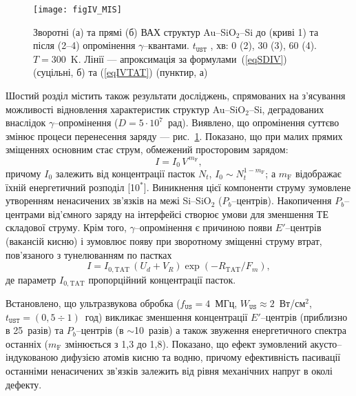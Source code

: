 \begin{figure}[b]
\center
\texttt{[image: figIV\_MIS]}%
\caption{\label{figIV_MIS}
Зворотні (а) та прямі (б) ВАХ структур Au--SiO$_2$--Si до (криві 1)
та після (2--4) опромінення $\gamma$--квантами.
$t_\mathtt{UST}$ , хв: 0 (2), 30 (3), 60 (4).
$T=300$~K.
Лінії --- апроксимація за формулами~(\ref{eqSDIV}) (суцільні, б) та (\ref{eqIVTAT}) (пунктир, а)
}%
\end{figure}

Шостий розділ містить також результати досліджень, спрямованих на з'ясування можливості відновлення характеристик структур Au--SiO$_2$--Si,
деградованих внаслідок $\gamma$--опромінення ($D=5\cdot10^7$~рад).
Виявлено, що опромінення суттєво змінює процеси перенесення заряду --- рис.~\ref{figIV_MIS}.
Показано, що при малих прямих зміщеннях основним стає струм, обмежений просторовим зарядом:
\begin{equation}\label{eqVIsclc}
  I=I_0\,V^{\,m_\mathrm{F}},
\end{equation}
причому $I_0$ залежить від концентрації пасток $N_t$, $I_0\!\sim\!N_t^{1-m_\mathrm{F}}$;
а $m_\mathrm{F}$ відображає їхній енергетичний розподіл
[10$^*$].
Виникнення цієї компоненти струму зумовлене утворенням ненасичених зв'язків на межі Si--SiO$_2$ ($P_b$--центрів).
Накопичення $P_b$--центрами від'ємного заряду на інтерфейсі створює умови для зменшення ТЕ складової струму.
Крім того, $\gamma$--опромінення є причиною появи $E'$--центрів (вакансій кисню) і зумовлює появу при зворотному зміщенні струму втрат, пов'язаного з тунелюванням по пастках
\begin{equation}\label{eqIVTAT}
  I=I_{0,\mathrm{TAT}}\,(U_d+V_R)\exp\left(-R_\mathrm{TAT}/F_m\right),
\end{equation}
де параметр $I_{0,\mathrm{TAT}}$ пропорційний концентрації пасток.

Встановлено, що
ультразвукова обробка
($f_\mathtt{US}=4$~МГц, $W_\mathtt{US}\approx2$~Вт/см$^2$, $t_\mathtt{UST}=(0,5\div1)$~год) викликає зменшення концентрації
$E'$--центрів
(приблизно в 25~разів)
та  $P_b$--центрів
(в $\sim$10~разів)
а також звуження енергетичного спектра останніх ($m_\mathrm{F}$ змінюється з 1,3 до 1,8).
Показано, що ефект зумовлений акусто--індукованою дифузією  атомів кисню та водню, причому ефективність пасивації останніми ненасичених зв'язків залежить
від рівня механічних напруг в околі дефекту.



